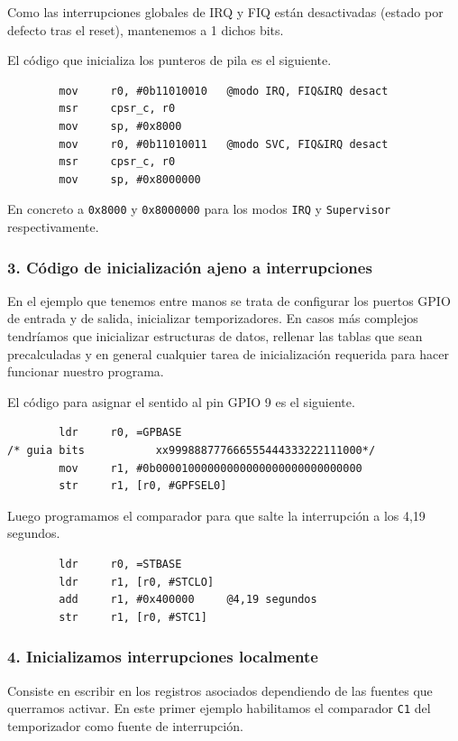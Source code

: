 Como las interrupciones globales de IRQ y FIQ están desactivadas (estado por defecto tras
el reset), mantenemos a 1 dichos bits.

El código que inicializa los punteros de pila es el siguiente.

\begin{lstlisting}
        mov     r0, #0b11010010   @modo IRQ, FIQ&IRQ desact
        msr     cpsr_c, r0
        mov     sp, #0x8000
        mov     r0, #0b11010011   @modo SVC, FIQ&IRQ desact
        msr     cpsr_c, r0
        mov     sp, #0x8000000
\end{lstlisting}

En concreto a {\tt 0x8000} y {\tt 0x8000000} para los modos {\tt IRQ} y
{\tt Supervisor} respectivamente.

\subsubsection{3. Código de inicialización ajeno a interrupciones}

En el ejemplo que tenemos entre manos se trata de configurar los puertos
GPIO de entrada y de salida, inicializar temporizadores. En casos más complejos tendríamos que
inicializar estructuras de datos, rellenar las tablas que sean precalculadas y en general
cualquier tarea de inicialización requerida para hacer funcionar nuestro programa.

El código para asignar el sentido al pin GPIO 9 es el siguiente.

\begin{lstlisting}
        ldr     r0, =GPBASE
/* guia bits           xx999888777666555444333222111000*/
        mov     r1, #0b00001000000000000000000000000000
        str     r1, [r0, #GPFSEL0]
\end{lstlisting}

Luego programamos el comparador para que salte la interrupción a los 4,19 segundos.

\begin{lstlisting}
        ldr     r0, =STBASE
        ldr     r1, [r0, #STCLO]
        add     r1, #0x400000     @4,19 segundos
        str     r1, [r0, #STC1]
\end{lstlisting}

\subsubsection{4. Inicializamos interrupciones localmente}

Consiste en escribir en los registros asociados dependiendo de las fuentes que querramos
activar. En este primer ejemplo habilitamos el comparador
{\tt C1} del temporizador como fuente de interrupción.

